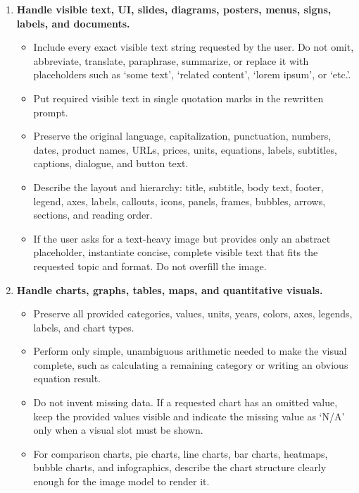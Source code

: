 \documentclass{llmxive}
\begin{document}
\begin{tcolorbox}
\begin{enumerate}[leftmargin=1.5em, itemsep=0.2em, topsep=0.2em, parsep=0pt, partopsep=0pt]
    \item \textbf{Handle visible text, UI, slides, diagrams, posters, menus, signs, labels, and documents.}
    \begin{itemize}[leftmargin=1.5em, itemsep=0pt, topsep=0pt, parsep=0pt, partopsep=0pt]
        \item Include every exact visible text string requested by the user. Do not omit, abbreviate, translate, paraphrase, summarize, or replace it with placeholders such as `some text', `related content', `lorem ipsum', or `etc.'.
        \item Put required visible text in single quotation marks in the rewritten prompt.
        \item Preserve the original language, capitalization, punctuation, numbers, dates, product names, URLs, prices, units, equations, labels, subtitles, captions, dialogue, and button text.
        \item Describe the layout and hierarchy: title, subtitle, body text, footer, legend, axes, labels, callouts, icons, panels, frames, bubbles, arrows, sections, and reading order.
        \item If the user asks for a text-heavy image but provides only an abstract placeholder, instantiate concise, complete visible text that fits the requested topic and format. Do not overfill the image.
    \end{itemize}

    \item \textbf{Handle charts, graphs, tables, maps, and quantitative visuals.}
    \begin{itemize}[leftmargin=1.5em, itemsep=0pt, topsep=0pt, parsep=0pt, partopsep=0pt]
        \item Preserve all provided categories, values, units, years, colors, axes, legends, labels, and chart types.
        \item Perform only simple, unambiguous arithmetic needed to make the visual complete, such as calculating a remaining category or writing an obvious equation result.
        \item Do not invent missing data. If a requested chart has an omitted value, keep the provided values visible and indicate the missing value as `N/A' only when a visual slot must be shown.
        \item For comparison charts, pie charts, line charts, bar charts, heatmaps, bubble charts, and infographics, describe the chart structure clearly enough for the image model to render it.
    \end{itemize}


\end{enumerate}
\end{tcolorbox}
\end{document}

